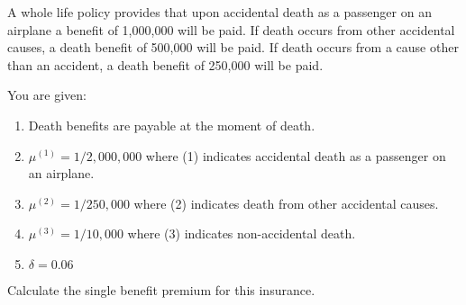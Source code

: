A whole life policy provides that upon accidental death as a passenger on an airplane a benefit of 
1,000,000 will be paid. If death occurs from other accidental causes, a death benefit of 500,000 
will be paid. If death occurs from a cause other than an accident, a death benefit of 250,000 will 
be paid.

You are given:
\begin{enumerate}
\item   Death benefits are payable at the moment of death.
\item  $ \mu^{(1)} = 1/2,000,000$  where (1) indicates accidental death as a passenger on an airplane.
\item  $\mu^{(2)} = 1/250,000$ where (2) indicates death from other accidental causes.
\item   $\mu^{(3)} = 1/10,000$ where (3) indicates non-accidental death.
\item   $\delta = 0.06$
\end{enumerate}
Calculate the single benefit premium for this insurance.

